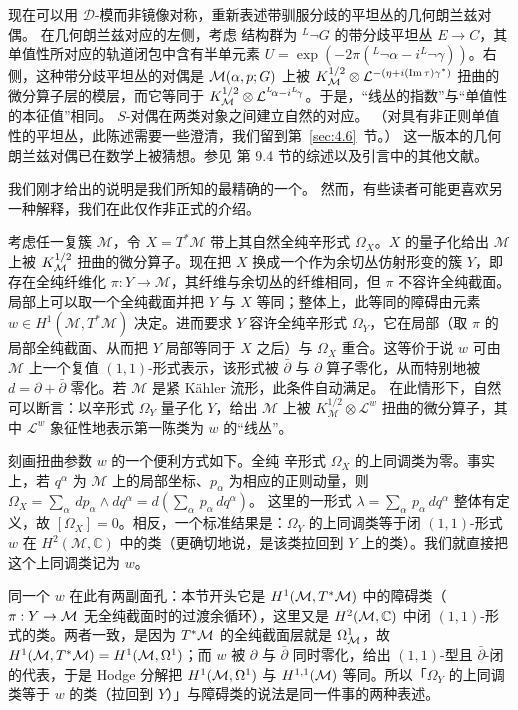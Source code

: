 现在可以用 ${\mathcal D}$-模而非镜像对称，重新表述带驯服分歧的平坦丛的几何朗兰兹对偶。
在几何朗兰兹对应的左侧，考虑
结构群为 $^L\neg G$ 的带分歧平坦丛 $E\to C$，其单值性所对应的轨道闭包中含有半单元素
$U=\exp(-2\pi({}^L\neg\alpha-i{}^L\neg\gamma))$。右侧，这种带分歧平坦丛的对偶是
${\mathcal{M}}(\alpha,p;G)$ 上被 $K_{\mathcal{M}}^{1/2}\otimes
{\mathcal L}^{-(\eta+i({\rm Im}\,\tau)\gamma^*)}$ 扭曲的微分算子层的模层，而它等同于
$K_{\mathcal{M}}^{1/2}\otimes
{\mathcal L}^{^L\negthinspace\alpha-i{}^L\negthinspace\gamma}$。于是，“线丛的指数”与“单值性的本征值”相同。
$S$-对偶在两类对象之间建立自然的对应。
（对具有非正则单值性的平坦丛，此陈述需要一些澄清，我们留到第~\ref{sec:4.6}~节。）
这一版本的几何朗兰兹对偶已在数学上被猜想。参见 \cite{ref7} 第 9.4 节的综述以及引言中的其他文献。

\bigskip{}

我们刚才给出的说明是我们所知的最精确的一个。
然而，有些读者可能更喜欢另一种解释，我们在此仅作非正式的介绍。

考虑任一复簇 ${\mathcal M}$，令 $X=T^*{\mathcal M}$ 带上其自然全纯辛形式 $\Omega_X$。$X$ 的量子化给出 ${\mathcal M}$ 上被 $K_{\mathcal{M}}^{1/2}$ 扭曲的微分算子。现在把 $X$ 换成一个作为余切丛仿射形变的簇 $Y$，即存在全纯纤维化 $\pi:Y\to {\mathcal M}$，其纤维与余切丛的纤维相同，但 $\pi$ 不容许全纯截面。局部上可以取一个全纯截面并把 $Y$ 与 $X$ 等同；整体上，此等同的障碍由元素 $w\in H^1({\mathcal M},T^*{\mathcal M})$ 决定。进而要求 $Y$ 容许全纯辛形式 $\Omega_Y$，它在局部（取 $\pi$ 的局部全纯截面、从而把 $Y$ 局部等同于 $X$ 之后）与 $\Omega_X$ 重合。这等价于说 $w$ 可由 ${\mathcal M}$ 上一个复值 $(1,1)$-形式表示，该形式被 $\bar\partial$ 与 $\partial$ 算子零化，从而特别地被 $d=\partial+\bar\partial$ 零化。若 ${\mathcal M}$ 是紧 Kähler 流形，此条件自动满足。
在此情形下，自然可以断言：以辛形式 $\Omega_Y$ 量子化 $Y$，给出 ${\mathcal M}$ 上被 $K_{\mathcal M}^{1/2}\otimes {\mathcal L}^w$ 扭曲的微分算子，其中 ${\mathcal L}^w$ 象征性地表示第一陈类为 $w$ 的“线丛”。

刻画扭曲参数 $w$ 的一个便利方式如下。全纯
辛形式 $\Omega_X$ 的上同调类为零。事实上，若 $q^\alpha$ 为 ${\mathcal M}$ 上的局部坐标、$p_\alpha$ 为相应的正则动量，则 $\Omega_X=\sum_\alpha
\,dp_\alpha\wedge dq^\alpha=d(\sum_\alpha\,p_\alpha\,dq^\alpha)$。
这里的一形式 $\lambda=
\sum_\alpha \,p_\alpha\,dq^\alpha$ 整体有定义，故 $[\Omega_X]=0$。相反，一个标准结果是：$\Omega_Y$ 的上同调类等于闭 $(1,1)$-形式 $w$ 在
$H^2({\mathcal M},\mathbb{C})$ 中的类（更确切地说，是该类拉回到 $Y$
上的类）。我们就直接把这个上同调类记为 $w$。

\begin{yizhu}[含糊点拨]
同一个 $w$ 在此有两副面孔：本节开头它是 $H^1({\mathcal{M}},T^*{\mathcal{M}})$ 中的障碍类（$\pi:Y\to{\mathcal{M}}$ 无全纯截面时的过渡余循环），这里又是 $H^2({\mathcal{M}},\mathbb{C})$ 中闭 $(1,1)$-形式的类。两者一致，是因为 $T^*{\mathcal{M}}$ 的全纯截面层就是 $\Omega^1_{\mathcal{M}}$，故 $H^1({\mathcal{M}},T^*{\mathcal{M}})=H^1({\mathcal{M}},\Omega^1)$；而 $w$ 被 $\partial$ 与 $\bar\partial$ 同时零化，给出 $(1,1)$-型且 $\bar\partial$-闭的代表，于是 Hodge 分解把 $H^1({\mathcal{M}},\Omega^1)$ 与 $H^{1,1}({\mathcal{M}})$ 等同。所以「$\Omega_Y$ 的上同调类等于 $w$ 的类（拉回到 $Y$）」与障碍类的说法是同一件事的两种表述。
\end{yizhu}

